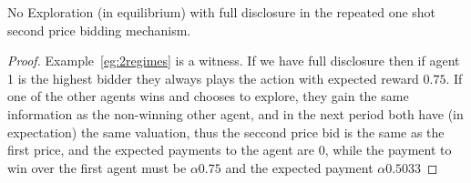 \begin{lem}
No Exploration (in equilibrium) with full disclosure in the repeated one shot second price bidding mechanism.
\end{lem}

\begin{proof}
Example~\ref{eg:2regimes} is a witness. If we have full disclosure then if agent 1 is the highest bidder they always plays the action with expected reward $0.75$. If one of the other agents wins and chooses to explore, they gain the same information as the non-winning other agent, and in the next period both have (in expectation) the same valuation, thus the seccond price bid is the same as the first price, and the expected payments to the agent are 0, while the payment to win over the first agent must be $\alpha 0.75$ and the expected payment $\alpha 0.5033$
\end{proof}













